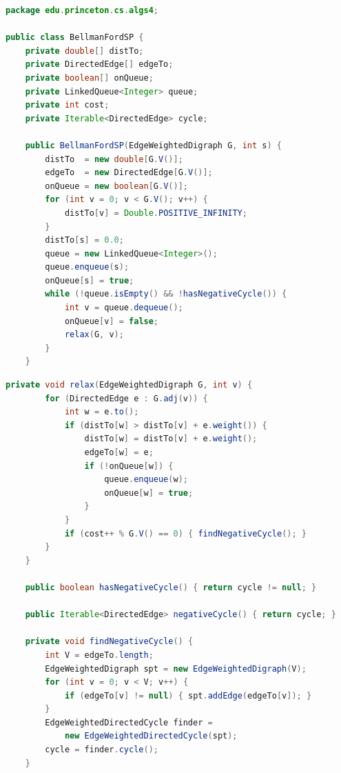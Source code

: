 \documentclass[8pt,a4paper,compress]{beamer}
\begin{document}
\begin{frame}[fragile]
\begin{lstlisting}[language=Java]
package edu.princeton.cs.algs4;

public class BellmanFordSP {
    private double[] distTo; 
    private DirectedEdge[] edgeTo; 
    private boolean[] onQueue; 
    private LinkedQueue<Integer> queue; 
    private int cost;
    private Iterable<DirectedEdge> cycle;  
    
    public BellmanFordSP(EdgeWeightedDigraph G, int s) {
        distTo  = new double[G.V()];
        edgeTo  = new DirectedEdge[G.V()];
        onQueue = new boolean[G.V()];
        for (int v = 0; v < G.V(); v++) {
            distTo[v] = Double.POSITIVE_INFINITY;
        }
        distTo[s] = 0.0;
        queue = new LinkedQueue<Integer>();
        queue.enqueue(s);
        onQueue[s] = true;
        while (!queue.isEmpty() && !hasNegativeCycle()) {
            int v = queue.dequeue();
            onQueue[v] = false;
            relax(G, v);
        }
    }
\end{lstlisting}
\end{frame}

\begin{frame}[fragile]
\begin{lstlisting}[language=Java]
    private void relax(EdgeWeightedDigraph G, int v) {
        for (DirectedEdge e : G.adj(v)) {
            int w = e.to();
            if (distTo[w] > distTo[v] + e.weight()) {
                distTo[w] = distTo[v] + e.weight();
                edgeTo[w] = e;
                if (!onQueue[w]) {
                    queue.enqueue(w);
                    onQueue[w] = true;
                }
            }
            if (cost++ % G.V() == 0) { findNegativeCycle(); }
        }
    }
    
    public boolean hasNegativeCycle() { return cycle != null; }

    public Iterable<DirectedEdge> negativeCycle() { return cycle; }
    
    private void findNegativeCycle() {
        int V = edgeTo.length;
        EdgeWeightedDigraph spt = new EdgeWeightedDigraph(V);
        for (int v = 0; v < V; v++) {
            if (edgeTo[v] != null) { spt.addEdge(edgeTo[v]); }
        }
        EdgeWeightedDirectedCycle finder = 
            new EdgeWeightedDirectedCycle(spt);
        cycle = finder.cycle();
    }
\end{lstlisting}
\end{frame}
\end{document}
